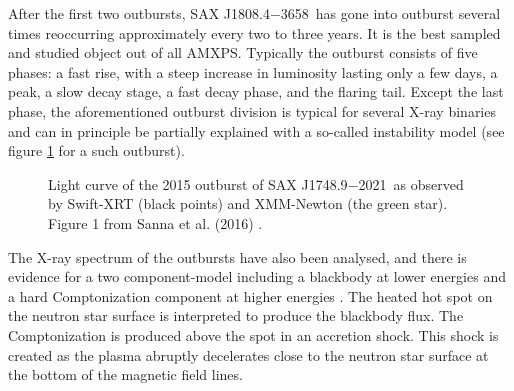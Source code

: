 \documentclass{wihuri}
\def\source{SAX J1808.4$-$3658}
\def\sourceb{SAX J1748.9$-$2021}
\begin{document}

After the first two outbursts, \source \ has gone into outburst several times reoccurring approximately every two to three years. It is the best sampled and studied object out of all AMXPS. Typically the outburst consists of five phases: a fast rise, with a steep increase in luminosity lasting only a few days, a peak, a slow decay stage, a fast decay phase, and the flaring tail. Except the last phase, the aforementioned outburst division is typical for several X-ray binaries and can in principle be partially explained with a so-called instability model \cite{disc-instability} (see figure \ref{fig:outburst} for a such outburst).




\begin{figure}
\centerline{} 
\caption{Light curve of the 2015 outburst of \sourceb \ as observed by Swift-XRT (black points) and XMM-Newton (the green star). Figure 1 from Sanna et al. (2016) \cite{outburst}.}%
\label{fig:outburst}
\end{figure}







The X-ray spectrum of the outbursts have also been analysed, and there is evidence for a two component-model including a blackbody at lower energies and a hard Comptonization component at higher energies \cite{twocompmod} %
. The heated hot spot on the neutron star surface is interpreted to produce the blackbody flux. The Comptonization is produced above the spot in an accretion shock. This shock is created as the plasma abruptly decelerates close to the neutron star surface at the bottom of the magnetic field lines.
\end{document}
